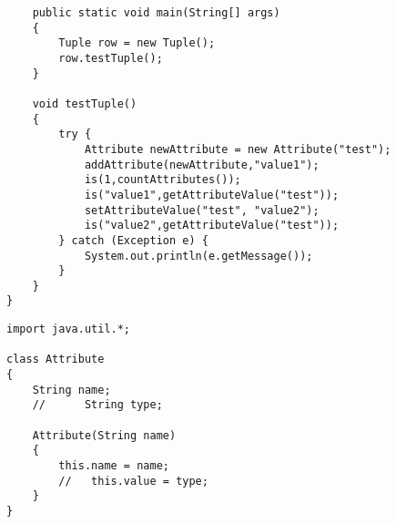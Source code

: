 \documentclass[11pt]{article} %
\begin{document}
\begin{lstlisting}
    public static void main(String[] args)
    {
        Tuple row = new Tuple();
        row.testTuple();
    }

    void testTuple()
    {
        try {
            Attribute newAttribute = new Attribute("test");
            addAttribute(newAttribute,"value1");
            is(1,countAttributes());
            is("value1",getAttributeValue("test"));
            setAttributeValue("test", "value2");
            is("value2",getAttributeValue("test"));
        } catch (Exception e) {
            System.out.println(e.getMessage());
        }
    }
}

\end{lstlisting}

\begin{lstlisting}
import java.util.*;

class Attribute
{
    String name;
    //      String type;
    
    Attribute(String name)
    {
        this.name = name;
        //   this.value = type;
    }
}
\end{lstlisting}
\end{document}
